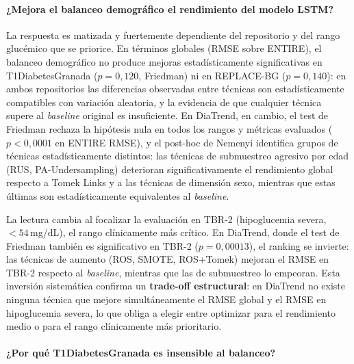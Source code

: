 \paragraph{¿Mejora el balanceo demográfico el rendimiento del modelo LSTM?}

La respuesta es matizada y fuertemente dependiente del repositorio y del rango
glucémico que se priorice. En términos globales (RMSE sobre ENTIRE), el balanceo
demográfico no produce mejoras estadísticamente significativas en
T1DiabetesGranada ($p = 0{,}120$, Friedman) ni en REPLACE-BG ($p = 0{,}140$):
en ambos repositorios las diferencias observadas entre técnicas son estadísticamente
compatibles con variación aleatoria, y la evidencia de que cualquier técnica supere
al \textit{baseline} original es insuficiente. En DiaTrend, en cambio, el test de
Friedman rechaza la hipótesis nula en todos los rangos y métricas evaluados
($p < 0{,}0001$ en ENTIRE RMSE), y el post-hoc de Nemenyi identifica grupos de
técnicas estadísticamente distintos: las técnicas de submuestreo agresivo por edad
(RUS, PA-Undersampling) deterioran significativamente el rendimiento global respecto
a Tomek Links y a las técnicas de dimensión sexo, mientras que estas últimas son
estadísticamente equivalentes al \textit{baseline}.

La lectura cambia al focalizar la evaluación en TBR-2 (hipoglucemia severa,
$<54$\,mg/dL), el rango clínicamente más crítico. En DiaTrend, donde el test de
Friedman también es significativo en TBR-2 ($p = 0{,}00013$), el ranking se
invierte: las técnicas de aumento (ROS, SMOTE, ROS+Tomek) mejoran el RMSE en
TBR-2 respecto al \textit{baseline}, mientras que las de submuestreo lo empeoran.
Esta inversión sistemática confirma un \textbf{trade-off estructural}: en DiaTrend
no existe ninguna técnica que mejore simultáneamente el RMSE global y el RMSE en
hipoglucemia severa, lo que obliga a elegir entre optimizar para el rendimiento
medio o para el rango clínicamente más prioritario.

\paragraph{¿Por qué T1DiabetesGranada es insensible al balanceo?}
\label{subsec:discusion_granada}

